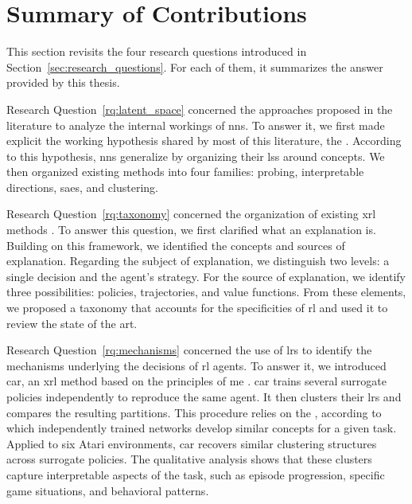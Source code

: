 \section{Summary of Contributions}
\label{sec:conclusion_summary}

This section revisits the four research questions introduced in Section~\ref{sec:research_questions}.
For each of them, it summarizes the answer provided by this thesis.

Research Question~\ref{rq:latent_space} concerned the approaches proposed in the literature to analyze the internal workings of \glspl{nn}.
To answer it, we first made explicit the working hypothesis shared by most of this literature, the \ConceptHypothesisName.
According to this hypothesis, \glspl{nn} generalize by organizing their \glspl{ls} around concepts.
We then organized existing methods into four families: probing, interpretable directions, \glspl{sae}, and clustering.

Research Question~\ref{rq:taxonomy} concerned the organization of existing \gls{xrl} methods \parencite{alaarabiou:hal-04685607, alaarabiou2026taxonomy}.
To answer this question, we first clarified what an explanation is.
Building on this framework, we identified the concepts and sources of explanation.
Regarding the subject of explanation, we distinguish two levels: a single decision and the agent's strategy.
For the source of explanation, we identify three possibilities: policies, trajectories, and value functions.
From these elements, we proposed a taxonomy that accounts for the specificities of \gls{rl} and used it to review the state of the art.

Research Question~\ref{rq:mechanisms} concerned the use of \glspl{lr} to identify the mechanisms underlying the decisions of \gls{rl} agents.
To answer it, we introduced \gls{car}, an \gls{xrl} method based on the principles of \gls{me} \parencite{alaarabiou2026car}.
\gls{car} trains several surrogate policies independently to reproduce the same agent.
It then clusters their \glspl{lr} and compares the resulting partitions.
This procedure relies on the \RepresentationConvergenceHypothesisName, according to which independently trained networks develop similar concepts for a given task.
Applied to six Atari environments, \gls{car} recovers similar clustering structures across surrogate policies.
The qualitative analysis shows that these clusters capture interpretable aspects of the task, such as episode progression, specific game situations, and behavioral patterns.

